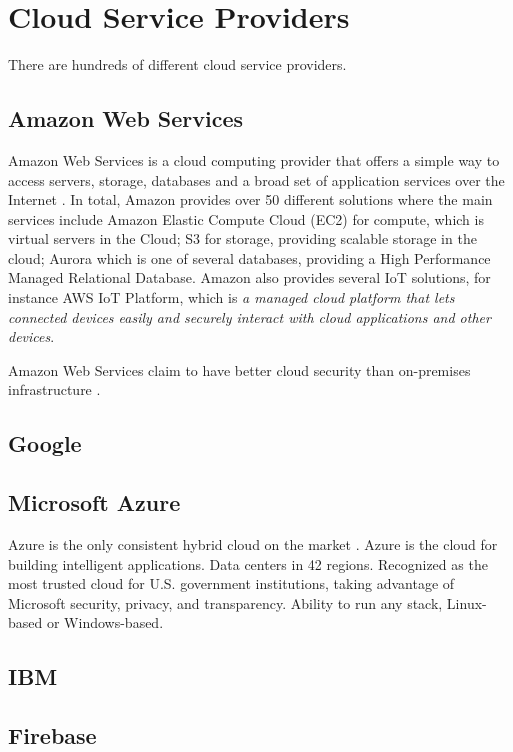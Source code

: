 \chapter{Cloud Service Providers}
There are hundreds of different cloud service providers. 

\section{Amazon Web Services}
Amazon Web Services is a cloud computing provider that offers a simple way to access servers, storage, databases and a broad set of application services over the Internet \cite{Amazon}. In total, Amazon provides over 50 different solutions where the main services include  Amazon Elastic Compute Cloud (EC2) for compute, which is virtual servers in the Cloud; S3 for storage, providing scalable storage in the cloud; Aurora which is one of several databases, providing a High Performance Managed Relational Database. Amazon also provides several IoT solutions, for instance AWS IoT Platform, which is \textit{a managed cloud platform that lets connected devices easily and securely interact with cloud applications and other devices}.



Amazon Web Services claim to have better cloud security than on-premises infrastructure \cite{Amazon}.

\section{Google}

\section{Microsoft Azure}
Azure is the only consistent hybrid cloud on the market \cite{Azure}. Azure is the cloud for building intelligent applications. Data centers in 42 regions. Recognized as the most trusted cloud for U.S. government institutions, taking advantage of Microsoft security, privacy, and transparency. Ability to run any stack, Linux-based or Windows-based.
\section{IBM}

\section{Firebase}

